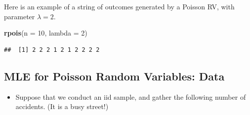 \documentclass[
]{book}
\newenvironment{Shaded}{\begin{snugshade}}{\end{snugshade}}
\newcommand{\AttributeTok}[1]{\textcolor[rgb]{0.13,0.29,0.53}{#1}}
\newcommand{\DecValTok}[1]{\textcolor[rgb]{0.00,0.00,0.81}{#1}}
\newcommand{\FunctionTok}[1]{\textcolor[rgb]{0.13,0.29,0.53}{\textbf{#1}}}
\newcommand{\NormalTok}[1]{#1}
\providecommand{\tightlist}{%
  \setlength{\itemsep}{0pt}\setlength{\parskip}{0pt}}
\theoremstyle{definition}
\theoremstyle{definition}
\theoremstyle{definition}
\theoremstyle{definition}
\theoremstyle{remark}
\begin{document}
Here is an example of a string of outcomes generated by a Poisson RV, with parameter \(\lambda = 2\).

\begin{Shaded}
\begin{Highlighting}[]
\FunctionTok{rpois}\NormalTok{(}\AttributeTok{n =} \DecValTok{10}\NormalTok{, }\AttributeTok{lambda =} \DecValTok{2}\NormalTok{)}
\end{Highlighting}
\end{Shaded}

\begin{verbatim}
##  [1] 2 2 2 1 2 1 2 2 2 2
\end{verbatim}

\hypertarget{mle-for-poisson-random-variables-data}{%
\subsection{MLE for Poisson Random Variables: Data}\label{mle-for-poisson-random-variables-data}}

\begin{itemize}
\tightlist
\item
  Suppose that we conduct an iid sample, and gather the following number of accidents. (It is a busy street!)
\end{itemize}
\end{document}
